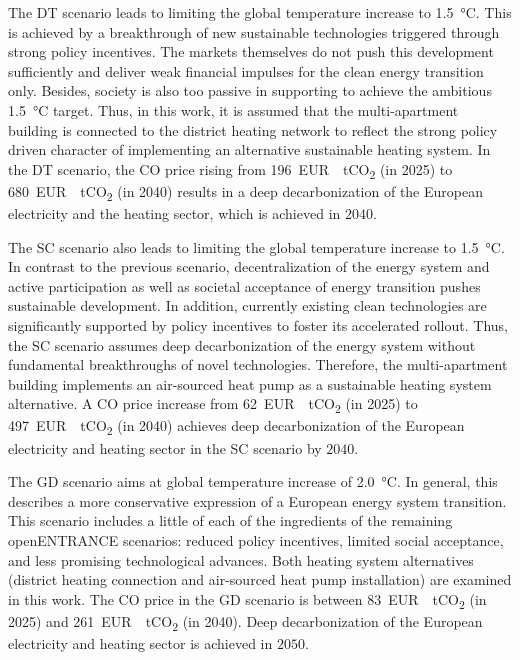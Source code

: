 The DT scenario leads to limiting the global temperature increase to \SI{1.5}{\degreeCelsius}. This is achieved by a breakthrough of new sustainable technologies triggered through strong policy incentives. The markets themselves do not push this development sufficiently and deliver weak financial impulses for the clean energy transition only. Besides, society is also too passive in supporting to achieve the ambitious \SI{1.5}{\degreeCelsius} target. Thus, in this work, it is assumed that the multi-apartment building is connected to the district heating network to reflect the strong policy driven character of implementing an alternative sustainable heating system. In the DT scenario, the CO price rising from \SI{196}{EUR \per tCO_{2}} (in 2025) to \SI{680}{EUR \per tCO_{2}} (in 2040) results in a deep decarbonization of the European electricity and the heating sector, which is achieved in $2040$.\vspace{0.5cm}

The SC scenario also leads to limiting the global temperature increase to \SI{1.5}{\degreeCelsius}. In contrast to the previous scenario, decentralization of the energy system and active participation as well as societal acceptance of energy transition pushes sustainable development. In addition, currently existing clean technologies are significantly supported by policy incentives to foster its accelerated rollout. Thus, the SC scenario assumes deep decarbonization of the energy system without fundamental breakthroughs of novel technologies. Therefore, the multi-apartment building implements an air-sourced heat pump as a sustainable heating system alternative. A CO price increase from \SI{62}{EUR \per tCO_{2}} (in 2025) to \SI{497}{EUR \per tCO_{2}} (in 2040) achieves deep decarbonization of the European electricity and heating sector in the SC scenario by $2040$.\vspace{0.5cm}

The GD scenario aims at  global temperature increase of \SI{2.0}{\degreeCelsius}. In general, this describes a more conservative expression of a European energy system transition. This scenario includes a little of each of the ingredients of the remaining openENTRANCE scenarios: reduced policy incentives, limited social acceptance, and less promising technological advances. Both heating system alternatives (district heating connection and air-sourced heat pump installation) are examined in this work. The CO price in the GD scenario is between \SI{83}{EUR \per tCO_{2}} (in 2025) and \SI{261}{EUR \per tCO_{2}} (in 2040). Deep decarbonization of the European electricity and heating sector is achieved in $2050$.\vspace{0.5cm}

